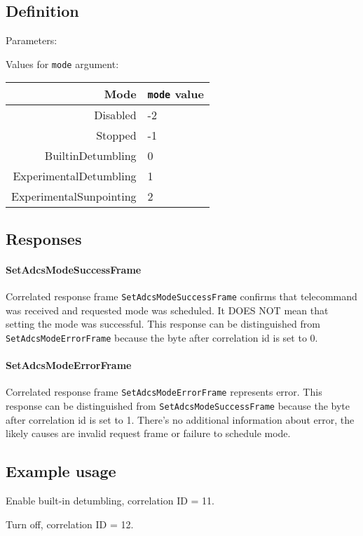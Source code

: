 \subsection{Definition}

Parameters: 

\begin{tcarglist}	
\end{tcarglist}

Values for \texttt{mode} argument:

\begin{tabular}{r | l}
    Mode & \texttt{mode} value \\
    \hline
    Disabled & -2 \\
    Stopped & -1 \\
    BuiltinDetumbling & 0 \\
    ExperimentalDetumbling & 1 \\
    ExperimentalSunpointing & 2 \\
\end{tabular}


\subsection{Responses}

\paragraph{SetAdcsModeSuccessFrame}
Correlated response frame \texttt{SetAdcsModeSuccessFrame} confirms that 
telecommand was received and requested \Adcs mode was scheduled. 
It DOES NOT mean that setting the mode was successful. This response can be 
distinguished from \texttt{SetAdcsModeErrorFrame} because the byte after 
correlation id is set to 0. 

\paragraph{SetAdcsModeErrorFrame}
Correlated response frame \texttt{SetAdcsModeErrorFrame} represents error. 
This response can be distinguished from \texttt{SetAdcsModeSuccessFrame} 
because the byte after correlation id is set to 1. There's no additional 
information about error, the likely causes are invalid request frame or 
failure to schedule \Adcs mode.

\subsection{Example usage}
Enable built-in detumbling, correlation ID = 11.


Turn \Adcs off, correlation ID = 12.

